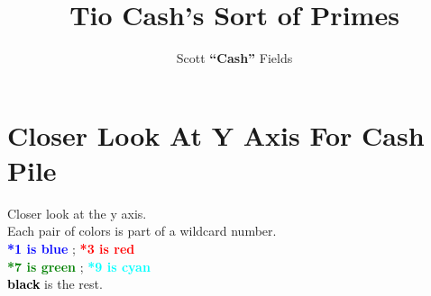 \documentclass[12pt,letterpaper,oneside,titlepage]{article}
\begin{document}
\author{Scott \textbf{``Cash''} Fields}
\title{Tio Cash's Sort of Primes}
\maketitle



\pagebreak
\section{Closer Look At Y Axis For Cash Pile}
\par 
Closer look at the y axis.
\\
Each pair of colors is part of a wild\textendash card number.
\\
\large
\textbf{\textcolor{blue}{*1 is blue}} \space ; \space \textbf{\textcolor{red}{*3 is red}} 
\\
\textbf{\textcolor{green}{*7 is green}} \space ; \space \textbf{\textcolor{cyan}{*9 is cyan}} 
\\
\textbf{\textcolor{black}{black}} is the rest.
\normalfont
\\
\\
\end{document}
